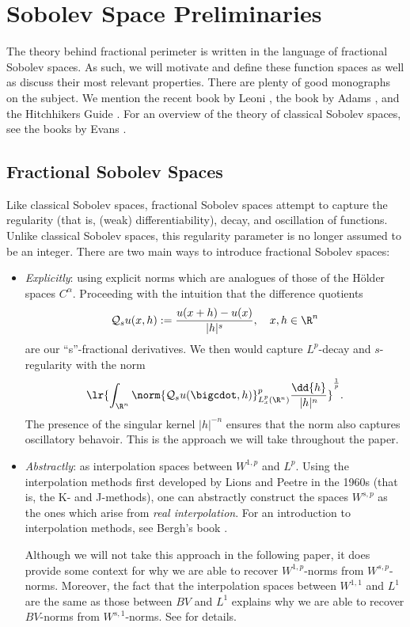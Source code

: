 \documentclass[../main.tex]{subfiles}
\begin{document}
\section{Sobolev Space Preliminaries}\label{sec:sobolev}


The theory behind fractional perimeter is written in the language of fractional Sobolev spaces. As such, we will motivate and define these function spaces as well as discuss their most relevant properties. There are plenty of good monographs on the subject. We mention the recent book by Leoni \cite{leoni:sobolev}, the book by Adams \cite{adams:sobolev}, and the Hitchhikers Guide \cite{hitchhiker}. For an overview of the theory of classical Sobolev spaces, see the books by Evans \cite{evans:pde, evans:gmt}.


\subsection{Fractional Sobolev Spaces}


Like classical Sobolev spaces, fractional Sobolev spaces attempt to capture the regularity (that is, (weak) differentiability), decay, and oscillation of functions. Unlike classical Sobolev spaces, this regularity parameter is no longer assumed to be an integer. There are two main ways to introduce fractional Sobolev spaces:

\begin{itemize}
    \item \textit{Explicitly}: using explicit norms which are analogues of those of the H\"older spaces $ C^{\alpha} $. Proceeding with the intuition that the difference quotients 
        \[
            \mathcal{Q}_{s}u(x,h):= \frac{u(x+h)-u(x)}{|h|^{s}},\quad x,h\in \R^{n}
        \]
    are our ``s''-fractional derivatives. We then would capture $ L^{p} $-decay and $ s $-regularity with the norm
    \[
        \lr{\int_{\R^{n}} \norm{\mathcal{Q}_{s}u(\bigcdot,h)}_{L^{p}_{x}(\R^{n})}^{p}\frac{\dd{h}}{|h|^{n}}}^{\frac{1}{p}}.
    \]
    The presence of the singular kernel $ |h|^{-n} $ ensures that the norm also captures oscillatory behavoir. This is the approach we will take throughout the paper.\\

    \item \textit{Abstractly}: as interpolation spaces between $ W^{1,p} $ and $ L^{p} $. Using the interpolation methods first developed by Lions and Peetre in the 1960s (that is, the K- and J-methods), one can abstractly construct the spaces $ W^{s,p} $ as the ones which arise from \textit{real interpolation}. For an introduction to interpolation methods, see Bergh's book \cite{bergh:interpolation}.

    Although we will not take this approach in the following paper, it does provide some context for why we are able to recover $ W^{1,p} $-norms from $ W^{s,p} $-norms. Moreover, the fact that the interpolation spaces between $ W^{1,1} $ and $ L^{1} $ are the same as those between $ BV $ and $ L^{1} $ explains why we are able to recover $ BV $-norms from $ W^{s,1} $-norms. See \cite{ponce:2017} for details.
\end{itemize}
\end{document}
